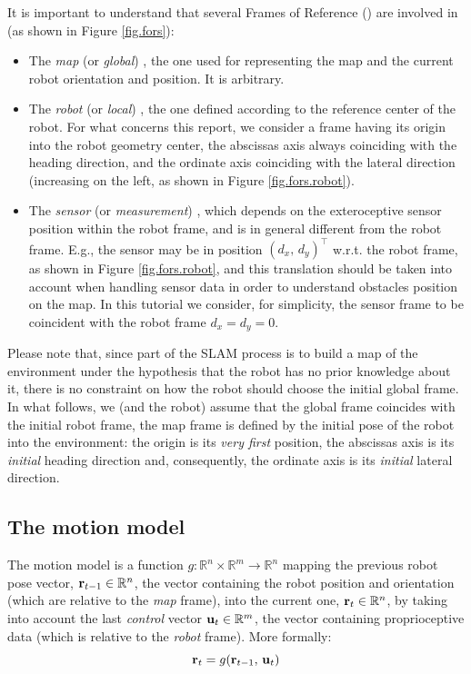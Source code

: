 It is important to understand that several Frames of Reference (\FoR{}) are involved in \SLAM{} (as shown in Figure \ref{fig.fors}):
\begin{itemize}
	\item The \emph{map} (or \emph{global}) \FoR{}, \ie{} the one used for representing the map and the current robot orientation and position. 
	It is arbitrary.
	
	\item The \emph{robot} (or \emph{local}) \FoR{}, \ie{} the one defined according to the reference center of the robot. 
	For what concerns this report, we consider a frame having its origin into the robot geometry center, the abscissas axis always coinciding with the heading direction, and the ordinate axis coinciding with the lateral direction (increasing on the left, as shown in Figure \ref{fig.fors.robot}).
	
	\item The \emph{sensor} (or \emph{measurement}) \FoR{}, which depends on the exteroceptive sensor position within the robot frame, and is in general different from the robot frame. 
	E.g., the sensor may be in position $(d_x,\, d_y)^\top$ w.r.t. the robot frame, as shown in Figure \ref{fig.fors.robot}, and this translation should be taken into account when handling sensor data in order to understand obstacles position on the map.
	In this tutorial we consider, for simplicity, the sensor frame to be coincident with the robot frame \ie{} $d_x = d_y = 0$.
	
\end{itemize}

Please note that, since part of the SLAM process is to build a map of the environment under the hypothesis that the robot has no prior knowledge about it, there is no constraint on how the robot should choose the initial global frame.
In what follows, we (and the robot) assume that the global frame coincides with the initial robot frame, \ie{} the map frame is defined by the initial pose of the robot into the environment: the origin is its \emph{very first} position, the abscissas axis is its \emph{initial} heading direction and, consequently, the ordinate axis is its \emph{initial} lateral direction.

\subsection{The motion model}
	The motion model is a function $g : \mathbb{R}^n \times \mathbb{R}^m \rightarrow \mathbb{R}^n$ mapping the previous robot pose vector, $\boldsymbol{\mathrm{{r}}}_{t-1} \in \mathbb{R}^n$, \ie{} the vector containing the robot position and orientation (which are relative to the \emph{map} frame), into the current one, $\boldsymbol{\mathrm{{r}}}_t \in \mathbb{R}^n$, by taking into account the last \emph{control} vector $\boldsymbol{\mathrm{{u}}}_t \in \mathbb{R}^m$, \ie{} the vector containing proprioceptive data (which is relative to the \emph{robot} frame). More formally:
	\[
		\boldsymbol{\mathrm{{r}}}_t = g(\boldsymbol{\mathrm{{r}}}_{t-1},\, \boldsymbol{\mathrm{{u}}}_t)
	\]
	
